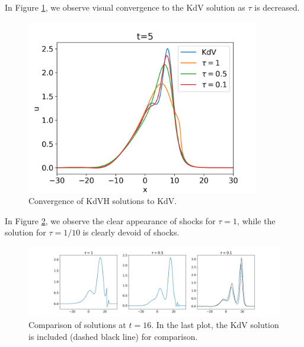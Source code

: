 \documentclass{article}
\begin{document}
In Figure \ref{fig:convergence}, we observe visual convergence to the KdV solution as
$\tau$ is decreased.

\begin{figure}
\centering
    \includegraphics[width=4in]{figures/Convergence.png}
    \caption{Convergence of KdVH solutions to KdV.\label{fig:convergence}}
\end{figure}

In Figure \ref{fig:shocks}, we observe the clear appearance of shocks for $\tau=1$, while
the solution for $\tau=1/10$ is clearly devoid of shocks.

\begin{figure}
\centering
    \includegraphics[width=6in]{figures/KdVH_solutions.png}
    \caption{Comparison of solutions at $t=16$.  In the last plot, the KdV solution is included (dashed black line)
    for comparison.\label{fig:shocks}}
\end{figure}
\end{document}
